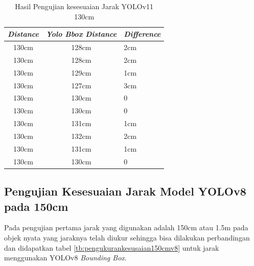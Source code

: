   \begin{table}[H]
    \centering
    \caption{Hasil Pengujian kesesuaian Jarak YOLOv11 130cm}
    \label{tb:pengukurankesusaian130cm}
    \begin{tabular}{|c|c|l|}
      \hline
      \textit{Distance} & \textit{Yolo Bbox Distance} & \textit{Difference} \\ \hline
      130cm             & 128cm                       & 2cm                 \\ \hline
      130cm             & 128cm                       & 2cm                 \\ \hline
      130cm             & 129cm                       & 1cm                 \\ \hline
      130cm             & 127cm                       & 3cm                 \\ \hline
      130cm             & 130cm                       & 0                   \\ \hline
      130cm             & 130cm                       & 0                   \\ \hline
      130cm             & 131cm                       & 1cm                 \\ \hline
      130cm             & 132cm                       & 2cm                 \\ \hline
      130cm             & 131cm                       & 1cm                 \\ \hline
      130cm             & 130cm                       & 0                   \\ \hline
      \end{tabular}
    \end{table}

\subsection{Pengujian Kesesuaian Jarak Model YOLOv8 pada 150cm}

Pada pengujian pertama jarak yang digunakan adalah 150cm atau 1.5m pada objek nyata yang jaraknya telah diukur sehingga bisa dilakukan perbandingan dan didapatkan tabel \ref{tb:pengukurankesusaian150cmv8} untuk jarak menggunakan YOLOv8 \emph{Bounding Box}.
    
